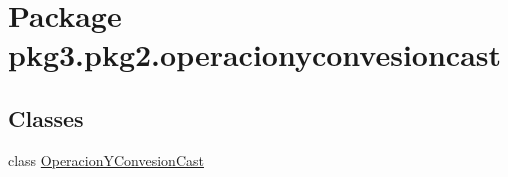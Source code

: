 \hypertarget{namespacepkg3_1_1pkg2_1_1operacionyconvesioncast}{}\section{Package pkg3.\+pkg2.\+operacionyconvesioncast}
\label{namespacepkg3_1_1pkg2_1_1operacionyconvesioncast}
\subsection*{Classes}
\begin{DoxyCompactItemize}
\item 
class \mbox{\hyperlink{classpkg3_1_1pkg2_1_1operacionyconvesioncast_1_1_operacion_y_convesion_cast}{Operacion\+Y\+Convesion\+Cast}}
\end{DoxyCompactItemize}
